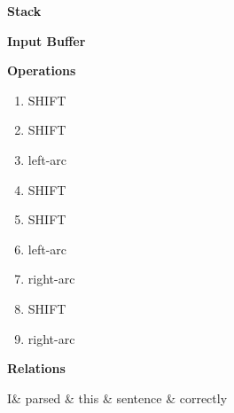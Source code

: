 \begin{multicols}{2}

	\textbf{Stack}

	\vspace{1cm}

	\begin{drawstack}
	\end{drawstack}
	\columnbreak
	
	\textbf{Input Buffer}
	\vspace{1cm}

	\textbf{Operations}
	\begin{enumerate}
		\item SHIFT
		\item SHIFT
		\item left-arc
		\item SHIFT
		\item SHIFT
		\item left-arc
		\item right-arc
		\item SHIFT
		\item right-arc
	\end{enumerate}
	
\end{multicols}
\begin{center}
	\textbf{Relations}

\begin{dependency}
	\begin{deptext}[column sep=0.2cm]
		I\& parsed \& this \& sentence \& correctly \\
   \end{deptext}
\end{dependency}
\end{center}
